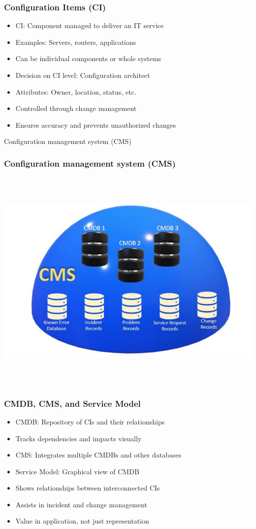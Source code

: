 \documentclass[aspectratio=169, table]{beamer}
\begin{document}
\begin{frame}
	\frametitle{Configuration Items (CI)}
	\begin{itemize}
		\item CI: Component managed to deliver an IT service
		\item Examples: Servers, routers, applications
		\item Can be individual components or whole systems
		\item Decision on CI level: Configuration architect
		\item Attributes: Owner, location, status, etc.
		\item Controlled through change management
		\item Ensures accuracy and prevents unauthorized changes
	\end{itemize}
\end{frame}

\begin{frame}{Configuration management system (CMS)} 	 \frametitle{ Configuration management system (CMS)} \begin{center} 	\includegraphics[width=0.6\linewidth]{images/image-03.png} \end{center} \end{frame}

\begin{frame}
	\frametitle{CMDB, CMS, and Service Model}
	\begin{itemize}
		\item CMDB: Repository of CIs and their relationships
		\item Tracks dependencies and impacts visually
		\item CMS: Integrates multiple CMDBs and other databases
		\item Service Model: Graphical view of CMDB
		\item Shows relationships between interconnected CIs
		\item Assists in incident and change management
		\item Value in application, not just representation
	\end{itemize}
\end{frame}
\end{document}
